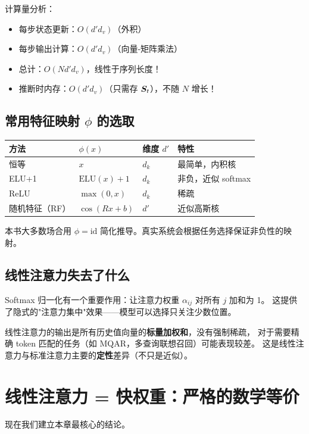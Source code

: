 计算量分析：
\begin{itemize}
  \item 每步状态更新：$O(d' d_v)$（外积）
  \item 每步输出计算：$O(d' d_v)$（向量-矩阵乘法）
  \item 总计：$O(N d' d_v)$，线性于序列长度！
  \item 推断时内存：$O(d' d_v)$（只需存 $\boldsymbol{S}_t$），不随 $N$ 增长！
\end{itemize}

\subsection*{常用特征映射 $\phi$ 的选取}

\begin{center}
\begin{tabular}{llll}
\toprule
方法 & $\phi(x)$ & 维度 $d'$ & 特性 \\
\midrule
恒等 & $x$ & $d_k$ & 最简单，内积核 \\
ELU+1 & $\text{ELU}(x) + 1$ & $d_k$ & 非负，近似 softmax \\
ReLU & $\max(0, x)$ & $d_k$ & 稀疏 \\
随机特征（RF） & $\cos(Rx + b)$ & $d'$ & 近似高斯核 \\
\bottomrule
\end{tabular}
\end{center}

本书大多数场合用 $\phi = \text{id}$ 简化推导。真实系统会根据任务选择保证非负性的映射。

\subsection*{线性注意力失去了什么}

Softmax 归一化有一个重要作用：让注意力权重 $\alpha_{ij}$ 对所有 $j$ 加和为 1。
这提供了隐式的"注意力集中"效果——模型可以选择只关注少数位置。

线性注意力的输出是所有历史值向量的\textbf{标量加权和}，没有强制稀疏，
对于需要精确 token 匹配的任务（如 MQAR，多查询联想召回）可能表现较差。
这是线性注意力与标准注意力主要的\textbf{定性}差异（不只是近似）。

\section{线性注意力 = 快权重：严格的数学等价}
\label{sec:lineattn_fastweight}

现在我们建立本章最核心的结论。

